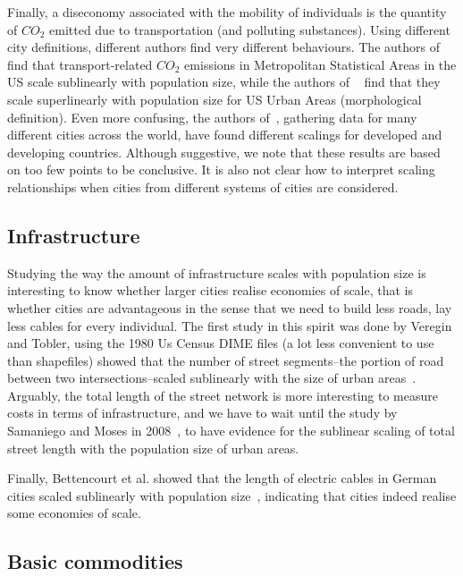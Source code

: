 Finally, a diseconomy associated with the mobility of individuals is the
quantity of $CO_2$ emitted due to transportation (and polluting substances).
Using different city definitions, different authors find very different
behaviours. The authors of \cite{Fragkias:2013} find that transport-related
$CO_2$ emissions in Metropolitan Statistical Areas in the US scale sublinearly
with population size, while the authors of
~\cite{Louf:2014_mobility,Oliveira:2014} find that they scale superlinearly with
population size for US Urban Areas (morphological definition). Even more
confusing, the authors of~\cite{Rybksi:2013}, gathering data for many different
cities across the world, have found different scalings for developed and
developing countries. Although suggestive, we note that these results are based
on too few points to be conclusive. It is also not clear how to interpret
scaling relationships when cities from different systems of cities are
considered.


\subsection{Infrastructure}
\label{sub:infrastructure}

Studying the way the amount of infrastructure scales with population size is
interesting to know whether larger cities realise economies of scale, that is
whether cities are advantageous in the sense that we need to build less
roads, lay less cables for every individual.
The first study in this spirit was done by Veregin and Tobler, using the 1980 Us
Census DIME files (a lot less convenient to use than shapefiles) showed that the
number of street segments--the portion of road between two intersections--scaled
sublinearly with the size of urban areas~\cite{Veregin:1997}. Arguably, the
total length of the street network is more interesting to measure costs in terms
of infrastructure, and we have to wait until the study by Samaniego and Moses in
2008~\cite{Samaniego:2008}, to have evidence for the sublinear scaling of total
street length with the population size of urban areas. 

Finally, Bettencourt et al. showed that the length of electric cables in German cities
scaled sublinearly with population size~\cite{Bettencourt:2007}, indicating that
cities indeed realise some economies of scale.

\subsection{Basic commodities}
\label{sub:basic_commodities}

